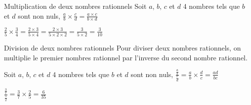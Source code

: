 \begin{pageCours}
\begin{minipage}[t]{0.5\linewidth}
\begin{DefT}{Multiplication de deux nombres rationnels}
Soit $a$, $b$, $c$ et $d$ 4 nombres tels que $b$ et $d$ sont non nuls, $\frac{a}{b}\times \frac{c}{d} = \frac{a\times c}{b\times d}$
\end{DefT}

\begin{Ex}
 $\frac{2}{5}\times \frac{3}{4} = \frac{2 \times 3 }{5 \times 4}  = \frac{2 \times 3 }{5 \times 2 \times 2}= \frac{3}{5 \times 2}= \frac{3}{10}$ 
\end{Ex}
\end{minipage}


\begin{minipage}[t]{0.6\linewidth}
\begin{DefT}{Division de deux nombres rationnels}
Pour diviser deux nombres rationnels, on multiplie le premier nombres rationnel par l'inverse du second nombre rationnel.

Soit $a$, $b$, $c$ et $d$ 4 nombres tels que $b$ et $d$ sont non nuls, $\frac{\frac{a}{b}}{ \frac{c}{d}} = \frac{a}{b}\times \frac{d}{c}=\frac{ad}{bc}$
\end{DefT}
\end{minipage}
\begin{minipage}[t]{0.4\linewidth}
\begin{Ex}
 $\frac{\frac{3}{7}}{\frac{5}{2}} =\frac{3}{7} \times \frac{2}{5}=\frac{6}{35}$ 
\end{Ex}
\end{minipage}


\end{pageCours} %


